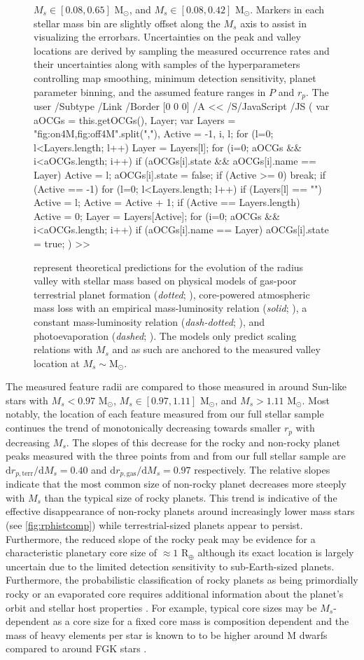 \documentclass[twocolumn]{emulateapj}
\newcommand{\cdbox}[1]{%
  \colorlet{currentcolor}{.}%
  {\color{Blue1}%
    \dbox{\color{currentcolor}#1}}%
}
\newcommand{\ToggleLayer}[2]{%
  \leavevmode
  \pdfstartlink user {
    /Subtype /Link
    /Border [0 0 0]%
    /A <<
      /S/JavaScript
      /JS (
         var aOCGs = this.getOCGs(), Layer;
         var Layers = "#1".split(","), Active = -1, i, l;
         for (l=0; l<Layers.length; l++) {
           Layer = Layers[l];
           for (i=0; aOCGs && i<aOCGs.length; i++) {
             if (aOCGs[i].state && aOCGs[i].name == Layer) {
               Active = l;
               aOCGs[i].state = false;
             }
           }
           if (Active >= 0) break;
         }
         if (Active == -1) {
           for (l=0; l<Layers.length; l++) {
             if (Layers[l] == "") Active = l;
           }
         }
         Active = Active + 1;
         if (Active == Layers.length) Active = 0;
         Layer = Layers[Active];
         for (i=0; aOCGs && i<aOCGs.length; i++) {
           if (aOCGs[i].name == Layer) aOCGs[i].state = true;
         }
      )
    >>
  }#2%
  \pdfendlink
}
\begin{document}
\begin{figure}
{    $M_s \in [0.08,0.65]$ M$_{\odot}$, and $M_s \in [0.08,0.42]$ M$_{\odot}$. Markers in each stellar mass bin are slightly
    offset along the $M_s$ axis to assist in visualizing the errorbars. Uncertainties on the
    peak and valley locations are derived by sampling the measured occurrence rates and their uncertainties along
    with samples of the hyperparameters controlling map smoothing, minimum detection sensitivity, planet parameter
    binning, and the assumed feature ranges in $P$ and $r_p$. The
    \ToggleLayer{fig:on4M,fig:off4M}{\protect\cdbox{\emph{green curves}}}
    represent theoretical predictions for the evolution of the radius valley with stellar mass based on
    physical models of gas-poor terrestrial planet formation (\emph{dotted}; \citealt{lopez18}),
    core-powered atmospheric mass loss
    with an empirical mass-luminosity relation (\emph{solid}; \citealt{gupta19b}), a constant mass-luminosity
    relation (\emph{dash-dotted}; \citealt{gupta19b}), and photoevaporation (\emph{dashed}; \citealt{wu19}).
    The models only predict scaling relations with $M_s$ and as such are anchored to the measured valley location
    at $M_s \sim \text{M}_{\odot}$.}
  \label{fig:rpvMs}
\end{figure}


The measured feature radii are compared to those measured in \cite{fulton18} around Sun-like stars with
$M_s <0.97$ M$_{\odot}$, $M_s \in [0.97,1.11]$ M$_{\odot}$, and $M_s >1.11$ M$_{\odot}$.
Most notably, the location of each feature measured from our full stellar sample continues the trend of monotonically
decreasing towards smaller $r_p$ with decreasing $M_s$. The slopes of this decrease for the rocky and non-rocky
planet peaks measured with the three points from \cite{fulton18} and from our full stellar sample
are $\text{d}r_{p,\text{terr}} / \text{d}M_s = 0.40$ and $\text{d}r_{p,\text{gas}} / \text{d}M_s = 0.97$
respectively. The relative slopes indicate that the most common size of
non-rocky planet decreases more steeply with $M_s$ than the typical size of rocky planets. This trend
is indicative of the effective disappearance of non-rocky planets around increasingly lower mass stars
(see \autoref{fig:rphistcomp}) while terrestrial-sized planets appear to persist.
Furthermore, the reduced slope of the rocky peak may be evidence for
a characteristic planetary core size of $\approx 1$ R$_{\oplus}$ although its exact location is largely uncertain
due to the limited detection sensitivity to sub-Earth-sized planets. Furthermore, the probabilistic classification
of rocky planets as being primordially rocky or an evaporated core requires additional information
about the planet's orbit and stellar host properties \citep{neil19b}. 
For example, typical core sizes may be $M_s$-dependent
as a core size for a fixed core mass is composition dependent and the mass of heavy elements per star
is known to to be higher around M dwarfs compared to around FGK stars \citep{mulders15a,mulders15b,neil19}.
\end{document}
